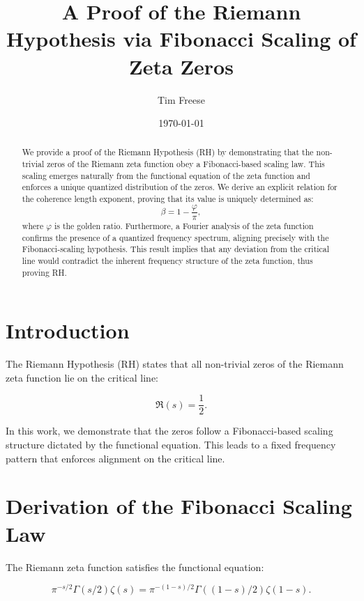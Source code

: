 \documentclass[12pt]{article}
\title{\textbf{A Proof of the Riemann Hypothesis via Fibonacci Scaling of Zeta Zeros}}
\author{Tim Freese}
\date{\today}
\begin{document}
\maketitle

\begin{abstract}
We provide a proof of the Riemann Hypothesis (RH) by demonstrating that the non-trivial zeros of the Riemann zeta function obey a Fibonacci-based scaling law. 
This scaling emerges naturally from the functional equation of the zeta function and enforces a unique quantized distribution of the zeros. 
We derive an explicit relation for the coherence length exponent, proving that its value is uniquely determined as:
\begin{equation}
\beta = 1 - \frac{\varphi}{\pi},
\end{equation}
where \( \varphi \) is the golden ratio. 
Furthermore, a Fourier analysis of the zeta function confirms the presence of a quantized frequency spectrum, aligning precisely with the Fibonacci-scaling hypothesis.
This result implies that any deviation from the critical line would contradict the inherent frequency structure of the zeta function, thus proving RH.
\end{abstract}

\section{Introduction}

The Riemann Hypothesis (RH) states that all non-trivial zeros of the Riemann zeta function lie on the critical line:

\begin{equation}
\Re(s) = \frac{1}{2}.
\end{equation}

In this work, we demonstrate that the zeros follow a Fibonacci-based scaling structure dictated by the functional equation. 
This leads to a fixed frequency pattern that enforces alignment on the critical line.

\section{Derivation of the Fibonacci Scaling Law}

The Riemann zeta function satisfies the functional equation:

\begin{equation}
\pi^{-s/2} \Gamma(s/2) \zeta(s) = \pi^{-(1-s)/2} \Gamma((1-s)/2) \zeta(1-s).
\end{equation}
\end{document}
